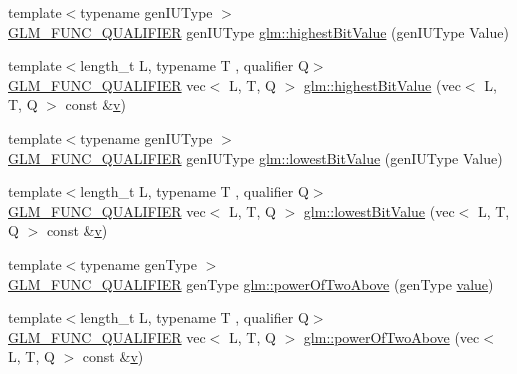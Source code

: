 \begin{DoxyCompactItemize}
\item 
{\footnotesize template$<$typename gen\+I\+U\+Type $>$ }\\\hyperlink{setup_8hpp_a33fdea6f91c5f834105f7415e2a64407}{G\+L\+M\+\_\+\+F\+U\+N\+C\+\_\+\+Q\+U\+A\+L\+I\+F\+I\+ER} gen\+I\+U\+Type \hyperlink{group__gtx__bit_ga0dcc8fe7c3d3ad60dea409281efa3d05}{glm\+::highest\+Bit\+Value} (gen\+I\+U\+Type Value)
\item 
{\footnotesize template$<$length\+\_\+t L, typename T , qualifier Q$>$ }\\\hyperlink{setup_8hpp_a33fdea6f91c5f834105f7415e2a64407}{G\+L\+M\+\_\+\+F\+U\+N\+C\+\_\+\+Q\+U\+A\+L\+I\+F\+I\+ER} vec$<$ L, T, Q $>$ \hyperlink{group__gtx__bit_ga898ef075ccf809a1e480faab48fe96bf}{glm\+::highest\+Bit\+Value} (vec$<$ L, T, Q $>$ const \&\hyperlink{_s_d_l__opengl_8h_a10a82eabcb59d2fcd74acee063775f90}{v})
\item 
{\footnotesize template$<$typename gen\+I\+U\+Type $>$ }\\\hyperlink{setup_8hpp_a33fdea6f91c5f834105f7415e2a64407}{G\+L\+M\+\_\+\+F\+U\+N\+C\+\_\+\+Q\+U\+A\+L\+I\+F\+I\+ER} gen\+I\+U\+Type \hyperlink{group__gtx__bit_ga2ff6568089f3a9b67f5c30918855fc6f}{glm\+::lowest\+Bit\+Value} (gen\+I\+U\+Type Value)
\item 
{\footnotesize template$<$length\+\_\+t L, typename T , qualifier Q$>$ }\\\hyperlink{setup_8hpp_a33fdea6f91c5f834105f7415e2a64407}{G\+L\+M\+\_\+\+F\+U\+N\+C\+\_\+\+Q\+U\+A\+L\+I\+F\+I\+ER} vec$<$ L, T, Q $>$ \hyperlink{namespaceglm_a1f1ffbc1179f77df9c5db1eea899754c}{glm\+::lowest\+Bit\+Value} (vec$<$ L, T, Q $>$ const \&\hyperlink{_s_d_l__opengl_8h_a10a82eabcb59d2fcd74acee063775f90}{v})
\item 
{\footnotesize template$<$typename gen\+Type $>$ }\\\hyperlink{setup_8hpp_a33fdea6f91c5f834105f7415e2a64407}{G\+L\+M\+\_\+\+F\+U\+N\+C\+\_\+\+Q\+U\+A\+L\+I\+F\+I\+ER} gen\+Type \hyperlink{namespaceglm_a4f29a0e902ea0e3a76fc10c5b0ef31b6}{glm\+::power\+Of\+Two\+Above} (gen\+Type \hyperlink{_s_d_l__opengl__glext_8h_a8ad81492d410ff2ac11f754f4042150f}{value})
\item 
{\footnotesize template$<$length\+\_\+t L, typename T , qualifier Q$>$ }\\\hyperlink{setup_8hpp_a33fdea6f91c5f834105f7415e2a64407}{G\+L\+M\+\_\+\+F\+U\+N\+C\+\_\+\+Q\+U\+A\+L\+I\+F\+I\+ER} vec$<$ L, T, Q $>$ \hyperlink{group__gtx__bit_ga2bbded187c5febfefc1e524ba31b3fab}{glm\+::power\+Of\+Two\+Above} (vec$<$ L, T, Q $>$ const \&\hyperlink{_s_d_l__opengl_8h_a10a82eabcb59d2fcd74acee063775f90}{v})

\end{DoxyCompactItemize}
